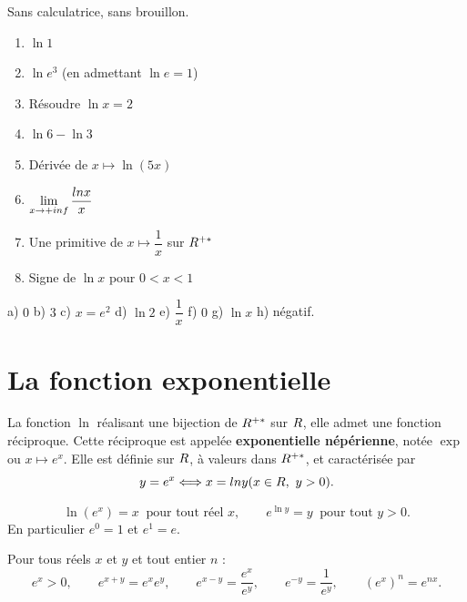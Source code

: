 \begin{automatismes}
Sans calculatrice, sans brouillon.

\begin{enumerate}[label=\textbf{\alph*)}, leftmargin=*, itemsep=0.25em]
  \item $\ln 1$
  \item $\ln e^{3}$ (en admettant $\ln e = 1$)
  \item Résoudre $\ln x = 2$
  \item $\ln 6 - \ln 3$
  \item Dérivée de $x \mapsto \ln(5x)$
  \item $\limpinf \dfrac{\ln x}{x}$
  \item Une primitive de $x \mapsto \dfrac{1}{x}$ sur $R^{+*}$
  \item Signe de $\ln x$ pour $0<x<1$
\end{enumerate}
\end{automatismes}

\begin{corrige}[automatismes]
a) $0$ \quad b) $3$ \quad c) $x = e^{2}$ \quad d) $\ln 2$ \quad
e) $\dfrac{1}{x}$ \quad f) $0$ \quad g) $\ln x$ \quad h) négatif.
\end{corrige}

\section{La fonction exponentielle}

\begin{definition}
La fonction $\ln$ réalisant une bijection de $R^{+*}$ sur $R$, elle admet une
fonction réciproque. Cette réciproque est appelée \textbf{exponentielle
népérienne}, notée $\exp$ ou $x \mapsto e^{x}$. Elle est définie sur $R$, à
valeurs dans $R^{+*}$, et caractérisée par
\[
  y = e^{x} \Longleftrightarrow x = ln y  (x \in R,\ y > 0).
\]
\end{definition}

\begin{propriete}
\[
  \ln\left(e^{x}\right) = x \ \text{ pour tout réel } x,
  \qquad
  e^{\ln y} = y \ \text{ pour tout } y>0 .
\]
En particulier $e^{0} = 1$ et $e^{1} = e$.
\end{propriete}

\begin{theoreme}
Pour tous réels $x$ et $y$ et tout entier $n$ :
\[
  e^{x} > 0, \qquad
  e^{x+y} = e^{x}e^{y}, \qquad
  e^{x-y} = \frac{e^{x}}{e^{y}}, \qquad
  e^{-y} = \frac{1}{e^{y}}, \qquad
  \left(e^{x}\right)^{n} = e^{nx}.
\]
\end{theoreme}

